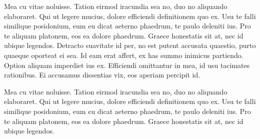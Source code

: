 Mea cu vitae noluisse. Tation eirmod iracundia sea no, duo no aliquando elaboraret. Qui ut legere mucius, dolore efficiendi definitionem quo ex. Usu te falli similique posidonium, eum eu dicat aeterno phaedrum, te paulo deleniti ius. Pro te aliquam platonem, eos ea dolore phaedrum. Graece honestatis sit at, nec id ubique legendos.
Detracto suavitate id per, no est putent accusata quaestio, purto quaeque oporteat ei sea. Id eam erat affert, ex has summo inimicus partiendo. Option aliquam imperdiet ius ex. Efficiendi omittantur in mea, id usu tacimates rationibus. Ei accusamus dissentias vix, eos aperiam percipit id.

Mea cu vitae noluisse. Tation eirmod iracundia sea no, duo no aliquando elaboraret. Qui ut legere mucius, dolore efficiendi definitionem quo ex. Usu te falli similique posidonium, eum eu dicat aeterno phaedrum, te paulo deleniti ius. Pro te aliquam platonem, eos ea dolore phaedrum. Graece honestatis sit at, nec id ubique legendos.

